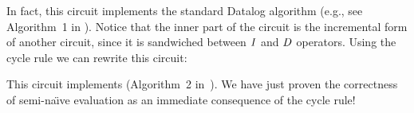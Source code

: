 In fact, this circuit implements the standard Datalog
 algorithm (e.g., see Algorithm~1 in
\cite{greco-sldm15}).  Notice that the inner part of the circuit is
the incremental form of another circuit, since it is sandwiched
between $\mathit{I}$ and $\mathit{D}$ operators.  Using the cycle rule we can
rewrite this circuit:
%
\begin{center}
\end{center}
\vspace{-2ex}
This circuit implements 
(Algorithm~2 in~\cite{greco-sldm15}).  We have just proven the
correctness of semi-na\"{\i}ve evaluation as an immediate consequence
of the cycle rule!

